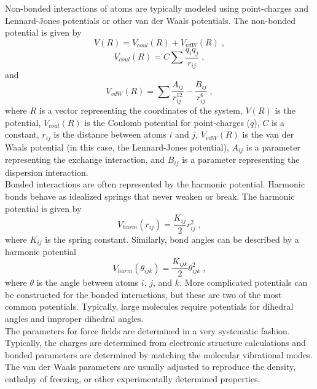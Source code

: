 \documentclass[12pt]{report}
\begin{document}
Non-bonded interactions of atoms are typically modeled using point-charges
and Lennard-Jones potentials or other van der Waals potentials. The non-bonded
potential is given by
\begin{equation}
 V(R) = V_{coul}(R)+V_{vdW}(R) \; ,
\end{equation} 
\begin{equation}
 V_{coul}(R) = C\sum \frac{q_iq_j}{r_{ij}} \; ,
\end{equation}
and
\begin{equation}
 V_{vdW}(R) = \sum \frac{A_{ij}}{r_{ij}^{12}}
              -\frac{B_{ij}}{r_{ij}^{6}} \; ,
\end{equation}
where $R$ is a vector representing the coordinates of the system, $V(R)$ is the
potential, $V_{coul}(R)$ is the Coulomb potential for point-charges ($q$),
$C$ is a constant, $r_{ij}$ is the distance between atoms $i$ and $j$,
$V_{vdW}(R)$ is the van der Waals potential (in this case, the Lennard-Jones
potential), $A_{ij}$ is a parameter representing the exchange interaction, and
$B_{ij}$ is a parameter representing the dispersion interaction. \\

Bonded interactions are often represented by the harmonic potential. Harmonic
bonds behave as idealized springs that never weaken or break. The harmonic
potential is given by
\begin{equation}
 V_{harm}(r_{ij}) = \frac{K_{ij}}{2}r_{ij}^2 \; ,
\end{equation}
where $K_{ij}$ is the spring constant. Similarly, bond angles can be described
by a harmonic potential
\begin{equation}
 V_{harm}(\theta_{ijk}) = \frac{K_{ijk}}{2}\theta_{ijk}^2 \; ,
\end{equation}
where $\theta$ is the angle between atoms $i$, $j$, and $k$. More complicated
potentials can be constructed for the bonded interactions, but these are two
of the most common potentials. Typically, large molecules require potentials
for dihedral angles and improper dihedral angles. \\

The parameters for force fields are determined in a very systematic fashion.
Typically, the charges are determined from electronic structure calculations
and bonded parameters are determined by matching the molecular vibrational
modes. The van der Waals parameters are usually adjusted to reproduce
the density, enthalpy of freezing, or other experimentally determined
properties.
\end{document}

